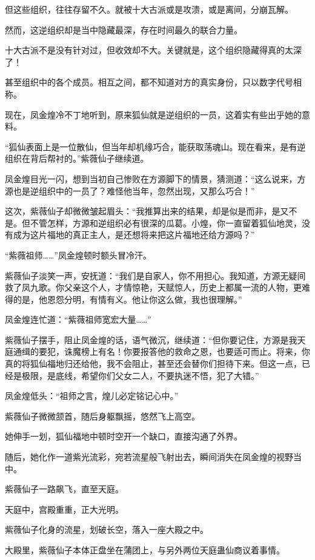 \begin{this_body}
但这些组织，往往存留不久。就被十大古派或是攻溃，或是离间，分崩瓦解。

然而，这逆组织却是当中隐藏最深，存在时间最久的联合力量。

十大古派不是没有针对过，但收效却不大。关键就是，这个组织隐藏得真的太深了！

甚至组织中的各个成员。相互之间，都不知道对方的真实身份，只以数字代号相称。

现在，凤金煌冷不丁地听到，原来狐仙就是逆组织的一员，这着实有些出乎她的意料。

“狐仙表面上是一位散仙，但当年却机缘巧合，能获取荡魂山。现在看来，是有逆组织在背后帮衬的。”紫薇仙子继续道。

凤金煌目光一闪，想到当初自己惨败在方源脚下的情景，猜测道：“这么说来，方源也是逆组织中的一员了？难怪他当年，忽然出现，又那么巧合！”

这次，紫薇仙子却微微皱起眉头：“我推算出来的结果，却是似是而非，是又不是。但不管怎样，方源和逆组织必有很深的瓜葛。小煌，你一直留着狐仙地灵，没有成为这片福地的真正主人，是还想将来把这片福地还给方源吗？”

“紫薇祖师……”凤金煌顿时额头冒冷汗。

紫薇仙子淡笑一声，安抚道：“我们是自家人，你不用担心。我知道，方源无疑间救了凤九歌。你父亲这个人，才情惊艳，天赋惊人，历史上都属一流的人物，更难得的是，他恩怨分明，有情有义。他让你这么做，我也很理解。”

凤金煌连忙道：“紫薇祖师宽宏大量……”

紫薇仙子摆手，阻止凤金煌的话，语气微沉，继续道：“但你要记住，方源是我天庭通缉的要犯，诛魔榜上有名！你要报答他的救命之恩，也要适可而止。将来，你真的将狐仙福地归还给他，我不会阻止，甚至还会替你们担待下来。但这一点，已经是极限，是底线，希望你们父女二人，不要执迷不悟，犯了大错。”

凤金煌低头：“祖师之言，煌儿必定铭记心中。”

紫薇仙子微微颔首，随后身躯飘摇，悠然飞上高空。

她伸手一划，狐仙福地中顿时空开一个缺口，直接沟通了外界。

随后，她化作一道紫光流彩，宛若流星般飞射出去，瞬间消失在凤金煌的视野当中。

紫薇仙子一路飙飞，直至天庭。

天庭中，宫殿重重，正大光明。

紫薇仙子化身的流星，划破长空，落入一座大殿之中。

大殿里，紫薇仙子本体正盘坐在蒲团上，与另外两位天庭蛊仙商议着事情。


\end{this_body}

